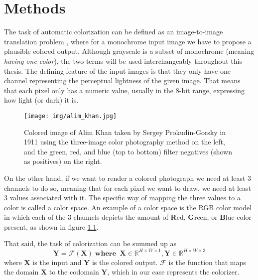 \begin{comment}
    Use cases
    Multimodality

    Neural networks:
        Basics
        CNN
        U-NET

    Dataset

    Implementations:
        Colorful image colorization
        GAN/pix2pix
        IDeep
\end{comment}

\chapter{Methods}
\label{ch:methods}

The task of automatic colorization can be defined as an image-to-image 
translation problem \citep{pang2021imagetoimage}, where for a monochrome 
input image we have to propose a plausible colored output. Although 
grayscale is a subset of monochrome (meaning \textit{having one color}), 
the two terms will be used interchangeably throughout this thesis. 
The defining feature of the input images is that they only have one channel 
representing the perceptual lightness of the given image. That means that 
each pixel only has a numeric value, usually in the 8-bit range, 
expressing how light (or dark) it is. 

\begin{figure}[H]
    \centering
    \texttt{[image: img/alim\_khan.jpg]}
    \caption{
    Colored image of Alim Khan taken by Sergey Prokudin-Gorsky 
    in 1911 using the three-image color photography method on the left,
    and the green, red, and blue (top to bottom) filter negatives
    (shown as positives) on the right.}
    \label{fig:alim_khan}
\end{figure}

On the other hand, if we want to render a colored photograph we need at 
least 3 channels to do so, meaning that for each pixel we want to draw, 
we need at least 3 values associated with it. The specific way of mapping 
the three values to a color is called a color space. An example of a color
space is the RGB color model in which each of the 3 channels depicts the 
amount of \textbf{R}ed, \textbf{G}reen, or \textbf{B}lue color present,
as shown in figure \ref{fig:alim_khan}. 

That said, the task of colorization can be summed up as
\begin{equation}
    \mathbf{Y} = \mathcal{F}(\mathbf{X})\;\mathbf{where}\;\;\mathbf{X} \in \mathbb{R}^{H \times W \times 1}, \mathbf{Y} \in \mathbb{R}^{H \times W \times 3}\label{eq:colorization}
\end{equation}    
where $\mathbf{X}$ is the input 
and $\mathbf{Y}$ is the colored output.
$\mathcal{F}$ is the function that maps the domain $\mathbf{X}$ to the codomain 
$\mathbf{Y}$, which in our case represents the colorizer.


